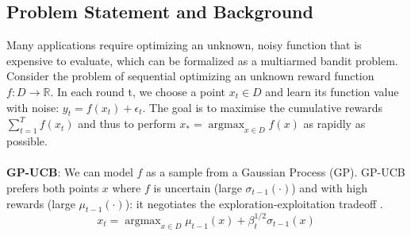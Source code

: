 \documentclass[a0,portrait]{a0poster}
\DeclareMathOperator*{\argmax}{argmax}
\begin{document}
\begin{multicols}{2} %


\section{Problem Statement and Background}
\vspace{-.2cm}

\noindent
Many applications require optimizing an unknown, noisy function that is expensive to evaluate, which can be formalized as a multiarmed bandit problem. Consider the problem of sequential optimizing an unknown reward function $f: D \rightarrow \mathbb{R}$. In each round t, we choose a point $x_t \in D$ and learn its function value with noise: $y_t = f(x_t) + \epsilon_t$. The goal is to maximise the cumulative rewards $\sum_{t=1}^T f(x_t)$ and thus to perform $x_\ast = \argmax_{x \in D} f(x)$ as rapidly as possible. \cite{srinivas2012}\\ \\ 
\textbf{GP-UCB}: We can model $f$ as a sample from a Gaussian Process (GP). GP-UCB prefers both points $x$ where $f$ is uncertain (large $\sigma_{t-1} (\cdot)$) and with high rewards (large $\mu_{t-1}(\cdot)$): it negotiates the exploration-exploitation tradeoff \cite{srinivas2012}.
$$x_t = \argmax_{x \in D} \mu_{t-1} (x) + \beta_t^{1/2} \sigma_{t-1} (x)$$


\end{multicols}
\end{document}
